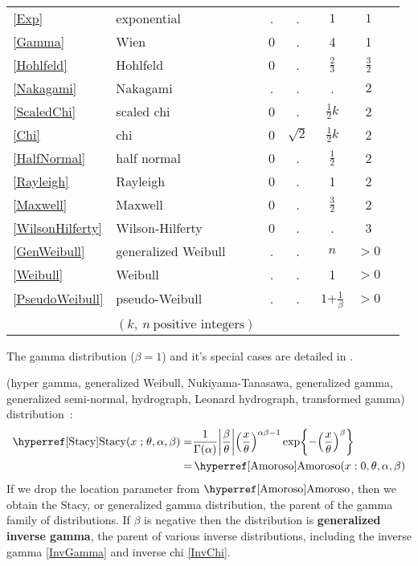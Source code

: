 \begin{table*}[p]
\begin{center}
{\begin{tabular}{llccccl}
\eqref{Exp} & exponential & . & . & $1$ & $1$ \\
\eqref{Gamma} & Wien & 0 & . & 4& 1 \\
\eqref{Hohlfeld} & Hohlfeld & 0 & . & $\tfrac{2}{3}$ & $\tfrac{3}{2}$ \\
\eqref{Nakagami} & Nakagami & . & . & . & $2$ \\
\eqref{ScaledChi} &scaled chi& 0 & . & $\tfrac{1}{2}k$  & 2  \\
\eqref{Chi} & chi & 0 & $\sqrt{2}$ & $\tfrac{1}{2}k$ & 2 \\
\eqref{HalfNormal} & half normal & 0 & . & $\tfrac{1}{2}$ & 2 & \\  
\eqref{Rayleigh} & Rayleigh & 0 & . & 1 & 2  \\
\eqref{Maxwell} & Maxwell& 0 & . & $\frac{3}{2}$  & 2  \\
\eqref{WilsonHilferty} &Wilson-Hilferty& 0 & . & .  & 3  \\
\eqref{GenWeibull} & generalized Weibull  & . & . & $n$ & $>\!\!0$  \\
\eqref{Weibull} & Weibull & . & . & 1 &  $>\!\!0$  \\
\eqref{PseudoWeibull} & pseudo-Weibull & . & . & $1$+$\tfrac{1}{\beta}$ &  $>\!\!0$  \\
\\
& $(k,\ n\ \text{positive integers})$
\end{tabular} 
}
\end{center}
\end{table*}




The gamma distribution ($\beta=1$) and it's special cases are detailed in .

 (hyper gamma, generalized Weibull, Nukiyama-Tanasawa, generalized gamma, generalized semi-normal, hydrograph, Leonard hydrograph, transformed gamma)  distribution~\cite{Stacy1962,Dadpay2007}:
\begin{align}
\label{Stacy}
\opr{Stacy}(x \given \theta, \alpha, \beta) 
=& \frac{1}{\Gamma(\alpha)} \Left|\frac{\beta}{\theta}\Right| \Left(\frac{x}{\theta}\Right)^{\alpha\beta-1} 
\exp \Left\{ -\Left(\frac{x}{\theta}\Right)^{\beta} \Right\} \checked
\\=&  \opr{Amoroso}(x\given  0, \theta, \alpha, \beta) \notag \checked
\end{align}
If we drop the location parameter from $\opr{Amoroso}$, then we obtain the 
Stacy, or generalized gamma distribution, the parent of the gamma family of distributions.
If $\beta$ is negative then the distribution is  {\bf generalized inverse gamma}, the parent of various inverse distributions, including the inverse gamma \eqref{InvGamma} and inverse chi \eqref{InvChi}. 


